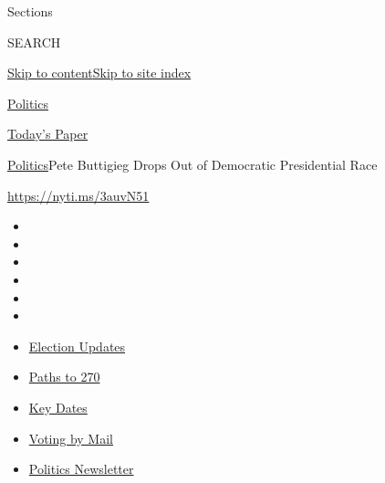 Sections

SEARCH

\protect\hyperlink{site-content}{Skip to
content}\protect\hyperlink{site-index}{Skip to site index}

\href{https://www.nytimes3xbfgragh.onion/section/politics}{Politics}

\href{https://myaccount.nytimes3xbfgragh.onion/auth/login?response_type=cookie\&client_id=vi}{}

\href{https://www.nytimes3xbfgragh.onion/section/todayspaper}{Today's
Paper}

\href{/section/politics}{Politics}\textbar{}Pete Buttigieg Drops Out of
Democratic Presidential Race

\url{https://nyti.ms/3auvN51}

\begin{itemize}
\item
\item
\item
\item
\item
\item
\end{itemize}

\begin{itemize}
\item
  \href{https://www.nytimes3xbfgragh.onion/live/2020/09/11/us/trump-vs-biden?action=click\&pgtype=Article\&state=default\&region=TOP_BANNER\&context=storylines_menu}{Election
  Updates}
\item
  \href{https://www.nytimes3xbfgragh.onion/interactive/2020/us/elections/election-states-biden-trump.html?action=click\&pgtype=Article\&state=default\&region=TOP_BANNER\&context=storylines_menu}{Paths
  to 270}
\item
  \href{https://www.nytimes3xbfgragh.onion/interactive/2019/us/elections/2020-presidential-election-calendar.html?action=click\&pgtype=Article\&state=default\&region=TOP_BANNER\&context=storylines_menu}{Key
  Dates}
\item
  \href{https://www.nytimes3xbfgragh.onion/interactive/2020/08/31/us/politics/vote-by-mail-deadlines.html?action=click\&pgtype=Article\&state=default\&region=TOP_BANNER\&context=storylines_menu}{Voting
  by Mail}
\item
  \href{https://www.nytimes3xbfgragh.onion/newsletters/politics?action=click\&pgtype=Article\&state=default\&region=TOP_BANNER\&context=storylines_menu}{Politics
  Newsletter}
\end{itemize}

